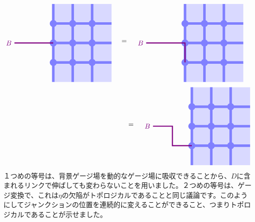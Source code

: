 \documentclass[report,paper=a4, fontsize=12pt, line_length=16cm, number_of_lines=33,dvipdfmx]{jlreq}
\numberwithin{equation}{chapter}
\begin{document}
\begin{align}
  \begin{tikzpicture}[baseline=0cm]
      \foreach \x in {0,1,2}{
          \foreach \y in {-2,-1,...,1}{
          \fill[plaqblue](\x,\y) rectangle (\x+1,\y+1);
          }
      }
      \foreach \x in {0,1,2}{
          \foreach \y in {-1,0,1}{
              \fill[linkblue] (\x,\y) circle (1.8mm);
          }
      }
      \foreach \x in {0,1,2}{
          \foreach \y in {-1,0,1}{
              \draw[linkblue, line width = 1.3mm](\x,\y)--(\x + 1,\y);
          }
      }
      \foreach \x in {0,1,2}{
          \foreach \y in {-2,-1,...,1}{
              \draw[linkblue, line width = 1.3mm](\x,\y)--(\x,\y + 1);
          }
      }
      \draw[red!50!blue, ultra thick](0,0)--(-2,0) node[left]{$B$};
  \end{tikzpicture}
  \quad = \quad
  \begin{tikzpicture}[baseline=0cm]
      \foreach \x in {0,1,2}{
          \foreach \y in {-2,-1,...,1}{
          \fill[plaqblue](\x,\y) rectangle (\x+1,\y+1);
          }
      }
      \foreach \x in {0,1,2}{
          \foreach \y in {-1,0,1}{
              \fill[linkblue] (\x,\y) circle (1.8mm);
          }
      }
      \foreach \x in {0,1,2}{
          \foreach \y in {-1,0,1}{
              \draw[linkblue, line width = 1.3mm](\x,\y)--(\x + 1,\y);
          }
      }
      \foreach \x in {0,1,2}{
          \foreach \y in {-2,-1,...,1}{
              \draw[linkblue, line width = 1.3mm](\x,\y)--(\x,\y + 1);
          }
      }
      \draw[red!50!blue, ultra thick](0,-1)--(0,0)--(-2,0) node[left]{$B$};
  \end{tikzpicture}    
  \quad \notag \\= \quad
  \begin{tikzpicture}[baseline=0cm]
      \foreach \x in {0,1,2}{
          \foreach \y in {-2,-1,...,1}{
          \fill[plaqblue](\x,\y) rectangle (\x+1,\y+1);
          }
      }
      \foreach \x in {0,1,2}{
          \foreach \y in {-1,0,1}{
              \fill[linkblue] (\x,\y) circle (1.8mm);
          }
      }
      \foreach \x in {0,1,2}{
          \foreach \y in {-1,0,1}{
              \draw[linkblue, line width = 1.3mm](\x,\y)--(\x + 1,\y);
          }
      }
      \foreach \x in {0,1,2}{
          \foreach \y in {-2,-1,...,1}{
              \draw[linkblue, line width = 1.3mm](\x,\y)--(\x,\y + 1);
          }
      }
      \draw[red!50!blue, ultra thick](0,-1)--(-1,-1)--(-1,0)--(-2,0) node[left]{$B$};
  \end{tikzpicture}    
\end{align}
１つめの等号は、背景ゲージ場を動的なゲージ場に吸収できることから、$D$に含まれるリンクで伸ばしても変わらないことを用いました。２つめの等号は、ゲージ変換で、これは$\eta$の欠陥がトポロジカルであることと同じ議論です。このようにしてジャンクションの位置を連続的に変えることができること、つまりトポロジカルであることが示せました。
\end{document}
